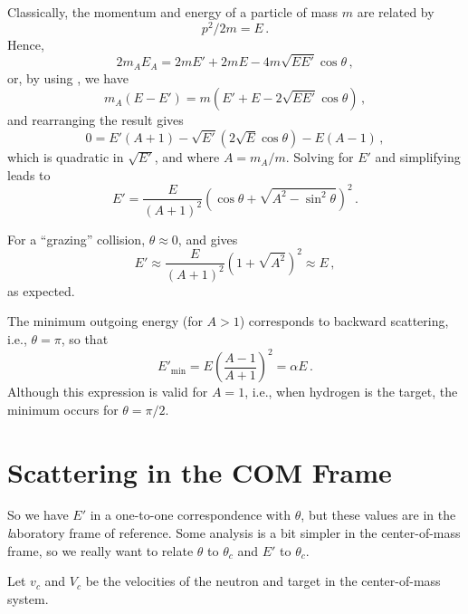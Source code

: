 Classically, the momentum and energy of a particle of 
mass $m$ are related by
\begin{equation}
  p^2 /2m = E \, .
\end{equation}
Hence,
\begin{equation}
 2 m_A E_A = 2 m E' + 2 m E - 4m \sqrt{E E'} \cos \theta \, ,
\end{equation}
or, by using , we have 
\begin{equation}
 m_A (E-E') = m (E' + E - 2 \sqrt{EE'}\cos \theta) \, ,
\end{equation}
and rearranging the result gives
\begin{equation}
  0 = E'(A+1) - \sqrt{E'} (2 \sqrt{E} \cos \theta ) - E (A-1) \, ,
\end{equation}
which is quadratic in $\sqrt{E'}$, and where $A=m_A/m$.  
Solving for $E'$ and 
simplifying leads to
\begin{equation}
 E' = \frac{E}{(A+1)^2} (\cos \theta + \sqrt{A^2 - \sin^2 \theta})^2 \, .
\label{eq:scattered_neutron_energy_lab}
\end{equation}

For a ``grazing'' collision, $\theta \approx 0$, 
and  gives
\begin{equation}
  E' \approx \frac{E}{(A+1)^2} (1 + \sqrt{A^2})^2 \approx E \, ,
\end{equation}
as expected.  

The minimum outgoing energy (for $A > 1$) corresponds to backward scattering,
i.e., $\theta = \pi$, so that
\begin{equation}
  E'_{\text{min}} = E \left ( \frac{A-1}{A+1} \right )^2 = \alpha E \, .
\end{equation}
Although this expression is valid for $A = 1$, i.e., when hydrogen is 
the target, the minimum occurs for $\theta = \pi/2$.

\section*{Scattering in the COM Frame}

So we have $E'$ in a one-to-one correspondence with $\theta$, but these 
values are in the {\emph laboratory} frame of reference.  Some 
analysis is a bit simpler in the center-of-mass frame, so we really
want to relate $\theta$ to $\theta_c$ and $E'$ to $\theta_c$.

Let $v_c$ and $V_c$ be the velocities of the neutron and target in the center-of-mass system.

